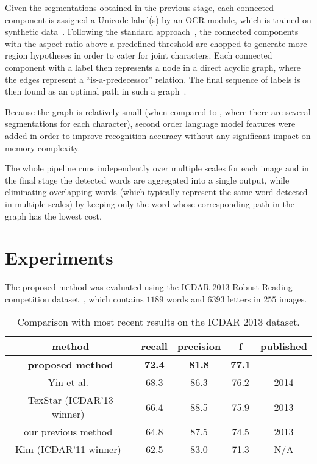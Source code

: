 \documentclass[conference]{IEEEtran}
\begin{document}
Given the segmentations obtained in the previous stage, each connected component is assigned a Unicode label(s) by an OCR module, which is trained on synthetic data~\cite{Neumann-ACCV10}. Following the standard approach~\cite{tesseract}, the connected components with the aspect ratio above a predefined threshold are chopped to generate more region hypotheses in order to cater for joint characters. Each connected component with a label then represents a node in a direct acyclic graph, where the edges represent a ``is-a-predecessor'' relation. The final sequence of labels is then found as an optimal path in such a graph~\cite{Neumann-ICDAR2013}.

Because the graph is relatively small (when compared to \cite{Neumann-ICDAR2013}, where there are several segmentations for each character), second order language model features were added in order to improve recognition accuracy without any significant impact on memory complexity.

The whole pipeline runs independently over multiple scales for each image and in the final stage the detected words are aggregated into a single output, while eliminating overlapping words (which typically represent the same word detected in multiple scales) by keeping only the word whose corresponding path in the graph has the lowest cost.






\section{Experiments}
\label{sec:experiments}
The proposed method was evaluated using the ICDAR 2013 Robust Reading competition dataset~\cite{ICDAR2013}, which contains $1189$ words and $6393$ letters in $255$ images.

\begin{table}
\caption{Comparison with most recent results on the ICDAR 2013 dataset.}
\label{table:icdarLocalization}
\centering
\begin{tabular}{|c||cc|c||c|}
\hline
method & recall & precision & f & published \\ \hline
\textbf{proposed method} & \textbf{72.4} & \textbf{81.8} & \textbf{77.1} & \\
Yin et al.~\cite{Yin-TPAMI2013} & 68.3 & 86.3 & 76.2 & 2014 \\
TexStar (ICDAR'13 winner)~\cite{ICDAR2013} & 66.4 & 88.5 & 75.9 & 2013 \\
our previous method~\cite{Neumann-ICDAR2013} & 64.8 & 87.5 & 74.5 & 2013 \\
Kim (ICDAR'11 winner)~\cite{ICDAR2011} & 62.5 & 83.0 & 71.3 & N/A \\
\hline
\end{tabular}
\vspace{-10pt}
\end{table}
\end{document}
